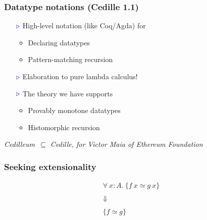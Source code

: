 \documentclass[11pt]{beamer}
\newcommand{\myb}[0]{\ensuremath{\textcolor{blue}{\triangleright}}}
\begin{document}
\begin{frame}
  \frametitle{Datatype notations (Cedille 1.1)}

  \begin{itemize}
  \item[$\myb$] High-level notation (like Coq/Agda) for
    \begin{itemize}
    \item Declaring datatypes
    \item Pattern-matching recursion
    \end{itemize}
\vspace{.18cm}
  \item[$\myb$] Elaboration to pure lambda calculus!
\vspace{.2cm}
  \item[$\myb$] The theory we have supports
    \begin{itemize}
    \item Provably monotone datatypes
    \item Histomorphic recursion
    \end{itemize}
\vspace{.2cm}
 
  \end{itemize}

\begin{center}
\color{blue}
  \emph{Cedilleum $\,\subseteq$ Cedille, for Victor Maia of Ethereum Foundation}
  \end{center}

\end{frame}

\begin{frame}
  \frametitle{Seeking extensionality}

\Large

  \[
  \begin{array}{c}
    \forall\ x : A.\ \{ f\ x \simeq g\ x \}
    \\    \\
    \Downarrow
    \\    \\
    \{ f \simeq g \}
  \end{array}
  \]

  \end{frame}

\newcommand{\csimeq}[1]{\simeq_{\color{red}#1}}
\end{document}
